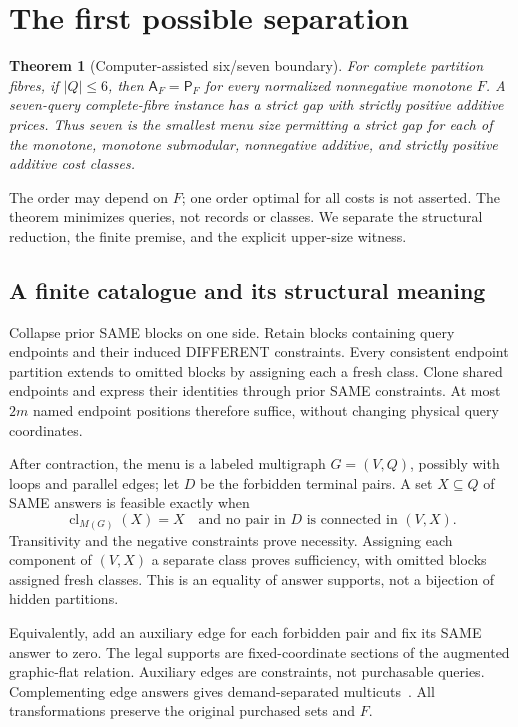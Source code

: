 \documentclass[pdflatex,sn-mathphys-num]{sn-jnl}
\newcommand{\A}{\mathsf{A}}
\newcommand{\Pcost}{\mathsf{P}}
\newcommand{\cl}{\operatorname{cl}}
\theoremstyle{thmstyleone}
\newtheorem{theorem}{Theorem}
\theoremstyle{thmstylethree}
\theoremstyle{thmstyletwo}
\begin{document}
\section{The first possible separation}
\begin{theorem}[Computer-assisted six/seven boundary]\label{thm:boundary}
For complete partition fibres, if $|Q|\leq6$, then $\A_F=\Pcost_F$ for every normalized nonnegative monotone $F$. A seven-query complete-fibre instance has a strict gap with strictly positive additive prices. Thus seven is the smallest menu size permitting a strict gap for each of the monotone, monotone submodular, nonnegative additive, and strictly positive additive cost classes.
\end{theorem}
The order may depend on $F$; one order optimal for all costs is not asserted. The theorem minimizes queries, not records or classes. We separate the structural reduction, the finite premise, and the explicit upper-size witness.

\subsection{A finite catalogue and its structural meaning}\label{sec:catalogue}
Collapse prior SAME blocks on one side. Retain blocks containing query endpoints and their induced DIFFERENT constraints. Every consistent endpoint partition extends to omitted blocks by assigning each a fresh class. Clone shared endpoints and express their identities through prior SAME constraints. At most $2m$ named endpoint positions therefore suffice, without changing physical query coordinates.

After contraction, the menu is a labeled multigraph $G=(V,Q)$, possibly with loops and parallel edges; let $D$ be the forbidden terminal pairs. A set $X\subseteq Q$ of SAME answers is feasible exactly when
\begin{equation}\label{eq:flat}
 \cl_{M(G)}(X)=X
 \quad\text{and no pair in }D\text{ is connected in }(V,X).
\end{equation}
Transitivity and the negative constraints prove necessity. Assigning each component of $(V,X)$ a separate class proves sufficiency, with omitted blocks assigned fresh classes. This is an equality of answer supports, not a bijection of hidden partitions.

Equivalently, add an auxiliary edge for each forbidden pair and fix its SAME answer to zero. The legal supports are fixed-coordinate sections of the augmented graphic-flat relation. Auxiliary edges are constraints, not purchasable queries. Complementing edge answers gives demand-separated multicuts~\cite{berczi,hornakova}. All transformations preserve the original purchased sets and $F$.
\end{document}
